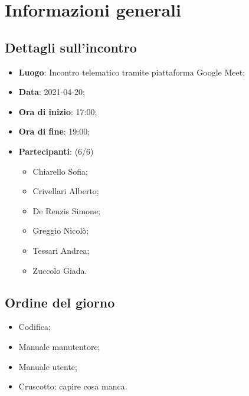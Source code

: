 \section{Informazioni generali}

\subsection{Dettagli sull'incontro}
\begin{itemize}
\item \textbf{Luogo}: Incontro telematico tramite piattaforma Google Meet;
\item \textbf{Data}: 2021-04-20;
\item \textbf{Ora di inizio}: 17:00;
\item \textbf{Ora di fine}: 19:00;
\item \textbf{Partecipanti}: (6/6) 
\begin{itemize}
	\item Chiarello Sofia;
	\item Crivellari Alberto;
	\item De Renzis Simone;
	\item Greggio Nicolò;
	\item Tessari Andrea;
	\item Zuccolo Giada.
\end{itemize}
\end{itemize}

\subsection{Ordine del giorno}
\begin{itemize}	
	\item Codifica;
	
	\item Manuale manutentore;
	
	\item Manuale utente;
	
	\item Cruscotto: capire cosa manca.
\end{itemize}




